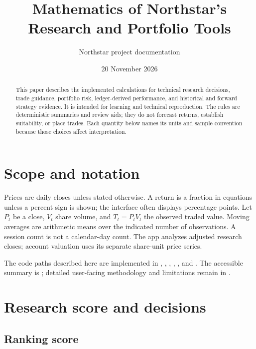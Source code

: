 \documentclass[11pt]{article}
\title{Mathematics of Northstar's Research and Portfolio Tools}
\author{Northstar project documentation}
\date{20 November 2026}
\begin{document}
\maketitle

\begin{abstract}
This paper describes the implemented calculations for technical research
decisions, trade guidance, portfolio risk, ledger-derived performance, and
historical and forward strategy evidence. It is intended for learning and
technical reproduction. The rules are deterministic summaries and review aids;
they do not forecast returns, establish suitability, or place trades. Each
quantity below names its units and sample convention because those choices
affect interpretation.
\end{abstract}

\section{Scope and notation}

Prices are daily closes unless stated otherwise. A return is a fraction in
equations unless a percent sign is shown; the interface often displays
percentage points. Let $P_t$ be a close, $V_t$ share volume, and $T_t=P_tV_t$
the observed traded value. Moving averages are arithmetic means over the
indicated number of observations. A session count is not a calendar-day count.
The app analyzes adjusted research closes; account valuation uses its separate
share-unit price series.

The code paths described here are implemented in
, , ,
, , and
. The accessible summary is ;
detailed user-facing methodology and limitations remain in
.

\section{Research score and decisions}

\subsection{Ranking score}
\end{document}
